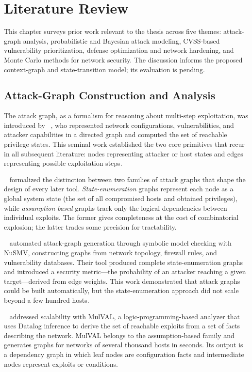 \chapter{Literature Review}
\label{ch:literature_review}

This chapter surveys prior work relevant to the thesis across five themes: attack-graph analysis, probabilistic and Bayesian attack modeling, CVSS-based vulnerability prioritization, defense optimization and network hardening, and Monte Carlo methods for network security. The discussion informs the proposed context-graph and state-transition model; its evaluation is pending.

\section{Attack-Graph Construction and Analysis}

The attack graph, as a formalism for reasoning about multi-step exploitation, was introduced by \citeauthor{phillips98}~\cite{phillips98}, who represented network configurations, vulnerabilities, and attacker capabilities in a directed graph and computed the set of reachable privilege states. This seminal work established the two core primitives that recur in all subsequent literature: nodes representing attacker or host states and edges representing possible exploitation steps.

\citeauthor{jha02two}~\cite{jha02two} formalized the distinction between two families of attack graphs that shape the design of every later tool. \emph{State-enumeration} graphs represent each node as a global system state (the set of all compromised hosts and obtained privileges), while \emph{assumption-based} graphs track only the logical dependencies between individual exploits. The former gives completeness at the cost of combinatorial explosion; the latter trades some precision for tractability.

\citeauthor{sheyner02}~\cite{sheyner02} automated attack-graph generation through symbolic model checking with NuSMV, constructing graphs from network topology, firewall rules, and vulnerability databases. Their tool produced complete state-enumeration graphs and introduced a security metric---the probability of an attacker reaching a given target---derived from edge weights. This work demonstrated that attack graphs could be built automatically, but the state-enumeration approach did not scale beyond a few hundred hosts.

\citeauthor{ou05mulval}~\cite{ou05mulval} addressed scalability with MulVAL, a logic-programming-based analyzer that uses Datalog inference to derive the set of reachable exploits from a set of facts describing the network. MulVAL belongs to the assumption-based family and generates graphs for networks of several thousand hosts in seconds. Its output is a dependency graph in which leaf nodes are configuration facts and intermediate nodes represent exploits or conditions.


